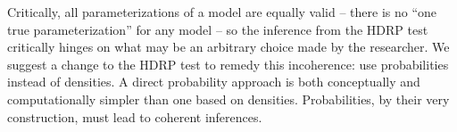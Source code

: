 \documentclass[9pt,twocolumn,twoside]{cidlab-draft}\templatetype{cidlab-invited}
\newcommand{\hdr}{HDRP}
\begin{document}
Critically, all parameterizations of a model are equally valid -- there is no ``one true parameterization'' for any model -- so the inference from the \hdr{} test critically hinges on what may be an arbitrary choice made by the researcher. We suggest a change to the \hdr{} test to remedy this incoherence: use probabilities instead of densities. A direct probability approach is both conceptually and computationally simpler than one based on densities. Probabilities, by their very construction, must lead to coherent inferences. 

\null

\end{document}
